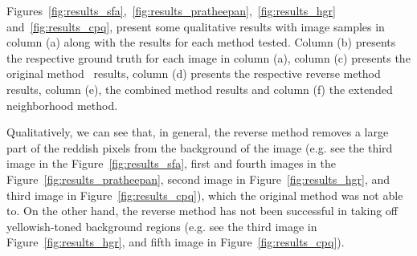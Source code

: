 Figures~\ref{fig:results_sfa},~\ref{fig:results_pratheepan},~\ref{fig:results_hgr} and~\ref{fig:results_cpq}, present some qualitative results with image samples in column (a) along with the results for each method tested. Column (b) presents the respective ground truth for each image in column (a), column (c) presents the original method~\cite{brancati:17} results, column (d) presents the respective reverse method results, column (e), the combined method results and column (f) the extended neighborhood method.

Qualitatively, we can see that, in general, the reverse method removes a large part of the reddish pixels from the background of the image (e.g. see the third image in the Figure~\ref{fig:results_sfa}, first and fourth images in the Figure~\ref{fig:results_pratheepan}, second image in Figure~\ref{fig:results_hgr}, and third image in Figure~\ref{fig:results_cpq}), which the original method was not able to. On the other hand, the reverse method has not been successful in taking off yellowish-toned background regions (e.g. see the third image in Figure~\ref{fig:results_hgr}, and fifth image in Figure~\ref{fig:results_cpq}).


